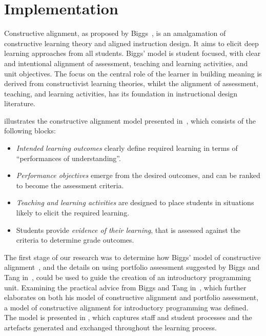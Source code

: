 
\section{Implementation} %
\label{sec:design}

Constructive alignment, as proposed by Biggs~\cite{Biggs:1996c}, is an amalgamation of constructive learning theory and aligned instruction design. It aims to elicit deep learning approaches from all students. Biggs' model is student focused, with clear and intentional alignment of assessment, teaching and learning activities, and unit objectives. The focus on the central role of the learner in building meaning is derived from constructivist learning theories, whilst the alignment of assessment, teaching, and learning activities, has its foundation in instructional design literature. 

 illustrates the constructive alignment model presented in~\cite{Houghton:2004}, which consists of the following blocks:

\begin{itemize}
	\item \emph{Intended learning outcomes} clearly define required learning in terms of ``performances of understanding''.
	\item \emph{Performance objectives} emerge from the desired outcomes, and can be ranked to become the assessment criteria.
	\item \emph{Teaching and learning activities} are designed to place students in situations likely to elicit the required learning.
	\item Students provide \emph{evidence of their learning}, that is assessed against the criteria to determine grade outcomes.
\end{itemize}


The first stage of our research was to determine how Biggs' model of constructive alignment~\cite{Biggs:1996c}, and the details on using portfolio assessment suggested by Biggs and Tang in~\cite{Biggs:1997}, could be used to guide the creation of an introductory programming unit. Examining the practical advice from Biggs and Tang in~\cite{Biggs:2007}, which further elaborates on both his model of constructive alignment and portfolio assessment, a model of constructive alignment for introductory programming was defined. The model is presented in , which captures staff and student processes and the artefacts generated and exchanged throughout the learning process.

